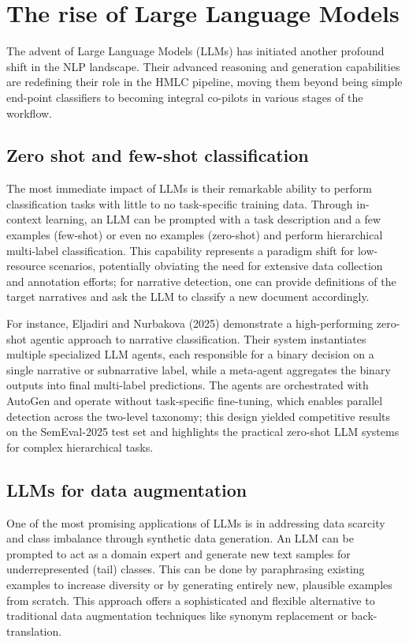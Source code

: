 \chapter{The rise of Large Language Models}

The advent of Large Language Models (LLMs) has initiated another profound shift in the NLP landscape. Their advanced reasoning and generation capabilities are redefining their role in the HMLC pipeline, moving them beyond being simple end-point classifiers to becoming integral co-pilots in various stages of the workflow.

\section{Zero shot and few-shot classification}
The most immediate impact of LLMs is their remarkable ability to perform classification tasks with little to no task-specific training data. Through in-context learning, an LLM can be prompted with a task description and a few examples (few-shot) or even no examples (zero-shot) and perform hierarchical multi-label classification. This capability represents a paradigm shift for low-resource scenarios, potentially obviating the need for extensive data collection and annotation efforts; for narrative detection, one can provide definitions of the target narratives and ask the LLM to classify a new document accordingly.~\cite{wang-etal-2023-text2topic}

For instance, Eljadiri and Nurbakova (2025) demonstrate a high-performing zero-shot agentic approach to narrative classification. Their system instantiates multiple specialized LLM agents, each responsible for a binary decision on a single narrative or subnarrative label, while a meta-agent aggregates the binary outputs into final multi-label predictions. The agents are orchestrated with AutoGen and operate without task-specific fine-tuning, which enables parallel detection across the two-level taxonomy; this design yielded competitive results on the SemEval-2025 test set and highlights the practical zero-shot LLM systems for complex hierarchical tasks.~\cite{eljadiri-nurbakova-2025-team}


\section{LLMs for data augmentation}
\label{sec:llm-augmentation}

One of the most promising applications of LLMs is in addressing data scarcity and class imbalance through synthetic data generation. An LLM can be prompted to act as a domain expert and generate new text samples for underrepresented (tail) classes. This can be done by paraphrasing existing examples to increase diversity or by generating entirely new, plausible examples from scratch. This approach offers a sophisticated and flexible alternative to traditional data augmentation techniques like synonym replacement or back-translation. \cite{cegin-etal-2025-llms,glazkova2024evaluating}

